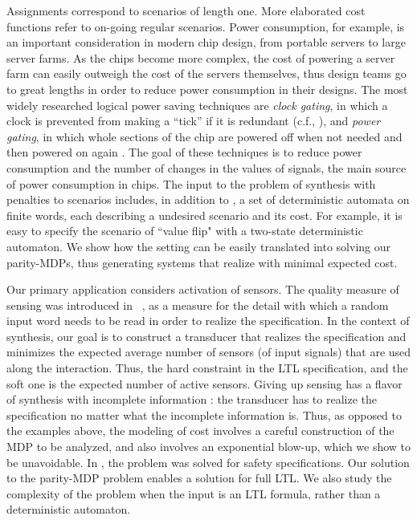 \documentclass[runningheads,a4paper]{llncs}
\begin{document}
Assignments correspond to scenarios of length one. More elaborated cost functions refer to on-going regular scenarios. 
Power consumption, for example, is an important consideration in modern chip design, from portable servers
to large server farms. As the chips become more complex, the cost of powering a server
farm can easily outweigh the cost of the servers themselves, thus design teams go to great
lengths in order to reduce power consumption in their designs.
The most widely researched logical power saving techniques are \emph{clock gating}, in which a clock is prevented from making a ``tick'' if it is redundant (c.f., \cite{ARY09}), and \emph{power gating}, in which whole sections of the chip are powered off when not needed and then powered on again \cite{KFAGS07,ENY09}. The goal of these techniques is to reduce power consumption and the number of changes in the values of signals, the main source of power consumption in chips. 
The input to the problem of synthesis with penalties to scenarios includes, in addition to , a set of deterministic automata on finite words, each describing a undesired scenario and its cost. For example, it is easy to specify the scenario of ``value flip" with a two-state deterministic automaton.
We show how the setting can be easily translated into solving our parity-MDPs, thus generating systems that realize  with minimal expected cost. 


Our primary application considers activation of sensors. The quality measure of sensing was introduced in ~\cite{AKK14,AKK15}, as a measure for the detail with which a random input word needs to be read in order to realize the specification. In the context of synthesis, our goal is to construct a transducer that realizes the specification and minimizes the expected average number of sensors (of input signals) that are used along the interaction.
Thus, the hard constraint in the LTL specification, and the soft one is the expected number of active sensors. 
Giving up sensing has a flavor of synthesis with incomplete information \cite{KV00a}: the transducer has to realize the specification no matter what the incomplete information is. Thus, as opposed to the examples above, the modeling of cost involves a careful construction of the MDP to be analyzed, and also involves an exponential blow-up, which we show to be unavoidable.  In \cite{AKK15}, the problem was solved for safety specifications. Our solution to the parity-MDP problem enables a solution for full LTL. We also study the complexity of the problem when the input is an LTL formula, rather than a deterministic automaton. 
\end{document}
